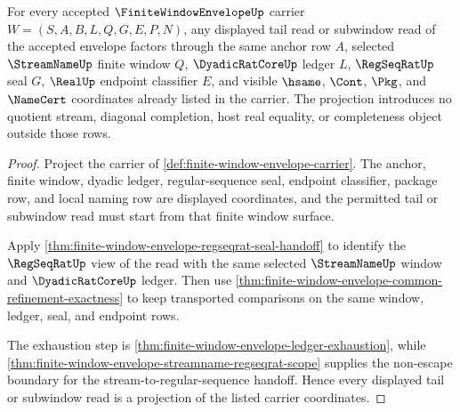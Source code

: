 \begin{theorem}
\label{thm:finite-window-envelope-tail-projection}
For every accepted $\FiniteWindowEnvelopeUp$ carrier $W=(S,A,B,L,Q,G,E,P,N)$, any displayed tail read or subwindow read of the accepted envelope factors through the same anchor row $A$, selected $\StreamNameUp$ finite window $Q$, $\DyadicRatCoreUp$ ledger $L$, $\RegSeqRatUp$ seal $G$, $\RealUp$ endpoint classifier $E$, and visible $\hsame$, $\Cont$, $\Pkg$, and $\NameCert$ coordinates already listed in the carrier. The projection introduces no quotient stream, diagonal completion, host real equality, or completeness object outside those rows.
\end{theorem}
\begin{proof}
Project the carrier of \autoref{def:finite-window-envelope-carrier}. The anchor, finite window, dyadic ledger, regular-sequence seal, endpoint classifier, package row, and local naming row are displayed coordinates, and the permitted tail or subwindow read must start from that finite window surface.

Apply \autoref{thm:finite-window-envelope-regseqrat-seal-handoff} to identify the $\RegSeqRatUp$ view of the read with the same selected $\StreamNameUp$ window and $\DyadicRatCoreUp$ ledger. Then use \autoref{thm:finite-window-envelope-common-refinement-exactness} to keep transported comparisons on the same window, ledger, seal, and endpoint rows.

The exhaustion step is \autoref{thm:finite-window-envelope-ledger-exhaustion}, while \autoref{thm:finite-window-envelope-streamname-regseqrat-scope} supplies the non-escape boundary for the stream-to-regular-sequence handoff. Hence every displayed tail or subwindow read is a projection of the listed carrier coordinates.
\end{proof}

